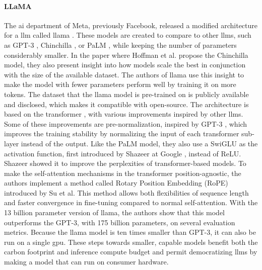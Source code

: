     \paragraph{LLaMA\\}
    The \gls{ai} department of Meta, previously Facebook, released a modified architecture for a \gls{llm} called \gls{llama} \cite{touvronLLaMAOpenEfficient2023}.
    These models are created to compare to other \glspl{llm}, such as GPT-3 \cite{brownLanguageModelsAre2020}, Chinchilla \cite{hoffmannTrainingComputeOptimalLarge2022}, or PaLM \cite{chowdheryPaLMScalingLanguage2022}, while keeping the number of parameters considerably smaller. In the paper where Hoffman et al. propose the Chinchilla model, they also present insight into how models scale the best in conjunction with the size of the available dataset. The authors of \gls{llama} use this insight to make the model with fewer parameters perform well by training it on more tokens. The dataset that the \gls{llama} model is pre-trained on is publicly available and disclosed, which makes it compatible with open-source. The architecture is based on the transformer \cite{vaswaniAttentionAllYou2017}, with various improvements inspired by other \glspl{llm}. Some of these improvements are pre-normalization, inspired by GPT-3 \cite{brownLanguageModelsAre2020}, which improves the training stability by normalizing the input of each transformer sub-layer instead of the output. Like the PaLM model, they also use a SwiGLU as the activation function, first introduced by Shazeer at Google \cite{shazeerGLUVariantsImprove2020}, instead of ReLU. Shazeer showed it to improve the perplexities of transformer-based models. To make the self-attention mechanisms in the transformer position-agnostic, the authors implement a method called Rotary Position Embedding (RoPE) introduced by Su et al. This method allows both flexibilities of sequence length and faster convergence in fine-tuning compared to normal self-attention. With the 13 billion parameter version of \gls{llama}, the authors show that this model outperforms the GPT-3, with 175 billion parameters, on several evaluation metrics. Because the \gls{llama} model is ten times smaller than GPT-3, it can also be run on a single \gls{gpu}. These steps towards smaller, capable models benefit both the carbon footprint and inference compute budget and permit democratizing \glspl{llm} by making a model that can run on consumer hardware.

